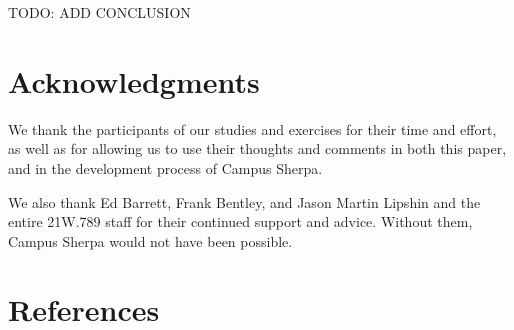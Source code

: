 \documentclass{sigchi}
\begin{document}
TODO: ADD CONCLUSION

\section{Acknowledgments}

We thank the participants of our studies and exercises for their time and effort, as well as for allowing us
to use their thoughts and comments in both this paper, and in the development process of Campus Sherpa.

We also thank Ed Barrett, Frank Bentley, and Jason Martin Lipshin and the entire 21W.789 staff for their continued support and advice. Without them, Campus Sherpa would not have been possible.

%
%
%
%
%
\balance

\section{References}



\end{document}
